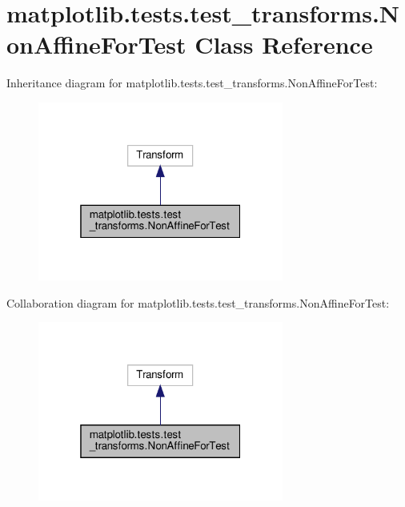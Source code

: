 \hypertarget{classmatplotlib_1_1tests_1_1test__transforms_1_1NonAffineForTest}{}\section{matplotlib.\+tests.\+test\+\_\+transforms.\+Non\+Affine\+For\+Test Class Reference}
\label{classmatplotlib_1_1tests_1_1test__transforms_1_1NonAffineForTest}


Inheritance diagram for matplotlib.\+tests.\+test\+\_\+transforms.\+Non\+Affine\+For\+Test\+:
\nopagebreak
\begin{figure}[H]
\begin{center}
\leavevmode
\includegraphics[width=229pt]{classmatplotlib_1_1tests_1_1test__transforms_1_1NonAffineForTest__inherit__graph}
\end{center}
\end{figure}


Collaboration diagram for matplotlib.\+tests.\+test\+\_\+transforms.\+Non\+Affine\+For\+Test\+:
\nopagebreak
\begin{figure}[H]
\begin{center}
\leavevmode
\includegraphics[width=229pt]{classmatplotlib_1_1tests_1_1test__transforms_1_1NonAffineForTest__coll__graph}
\end{center}
\end{figure}
